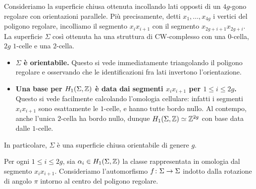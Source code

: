 Consideriamo la superficie chiusa ottenuta incollando lati opposti di un $4g$-gono regolare con orientazioni parallele. Più precisamente, detti $x_1,\ldots,x_{4g}$ i vertici del poligono regolare, incolliamo il segmento $x_ix_{i+1}$ con il segmento $x_{2g+i+1}x_{2g+i}$. La superficie $\Sigma$ così ottenuta ha una struttura di CW-complesso con una $0$-cella, $2g$ $1$-celle e una $2$-cella.
\begin{center}
\end{center}
\begin{itemize}
\item\textbf{$\Sigma$ è orientabile.} Questo si vede immediatamente triangolando il poligono regolare e osservando che le identificazioni fra lati invertono l'orientazione.
\item\textbf{Una base per $H_1(\Sigma,\mathbb{Z})$ è data dai segmenti $x_ix_{i+1}$ per $1\le i\le 2g$.} Questo si vede facilmente calcolando l'omologia cellulare: infatti i segmenti $x_ix_{i+1}$ sono esattamente le $1$-celle, e hanno tutte bordo nullo. Al contempo, anche l'unica $2$-cella ha bordo nullo, dunque $H_1(\Sigma,\mathbb{Z})\simeq\mathbb{Z}^{2g}$ con base data dalle $1$-celle.
\end{itemize}
In particolare, $\Sigma$ è una superficie chiusa orientabile di genere $g$.

Per ogni $1\le i\le 2g$, sia $\alpha_i\in H_1(\Sigma,\mathbb{Z})$ la classe rappresentata in omologia dal segmento $x_ix_{i+1}$. Consideriamo l'automorfismo $\map{f}{\Sigma}{\Sigma}$ indotto dalla rotazione di angolo $\pi$ intorno al centro del poligono regolare.

\begin{center}
\end{center}

